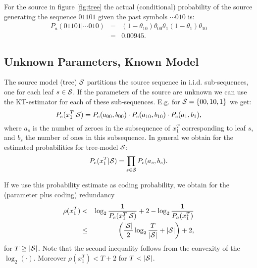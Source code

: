 \documentclass[10pt,conference]{IEEEtran}
\newcommand{\xT}{x^{T}_{1}}
\newcommand{\cS}{{\cal{S}}}
\begin{document}
For the source in figure \ref{fig:tree} the actual (conditional) probability of the source generating the sequence $01101$ given the past symbols $\cdots 010$ is:
\begin{eqnarray}
P_{a}(01101|\cdots 010)
&=& (1-\theta_{10}) \theta_{00} \theta_{1} (1-\theta_{1}) \theta_{10} \nonumber \\
&=& 0.00945.
\end{eqnarray}

\subsection{Unknown Parameters, Known Model}\label{subsec:knownmodel}
The source model (tree) $\cS$ partitions the source sequence in i.i.d. sub-sequences, one for each leaf $s\in\cS$.
If the parameters of the source are unknown we can use the KT-estimator for each of these sub-sequences.
E.g. for ${\cal S}= \{ 00, 10,1\}$ we get:
\begin{equation}
P_{e}(\xT|{\cal S}) = P_{e}(a_{00},b_{00}) \cdot P_{e}(a_{10},b_{10})\cdot P_{e}(a_{1},b_{1}),
\end{equation}
where $a_{s}$ is the number of zeroes in the subsequence of $\xT$ corresponding to leaf $s$, and $b_{s}$ the number of ones in this subsequence.
In general we obtain for the estimated probabilities for tree-model ${\cal S}$:
\begin{equation}
P_{e}(\xT|{\cal S}) = \prod_{s\in {\cal S}} P_{e}(a_{s},b_{s}).
\label{eq:codprobknmod}
\end{equation}

If we use this probability estimate as coding probability, we obtain for the (parameter plus coding) redundancy
\begin{eqnarray}
\rho(\xT) & < & \log_{2}\frac{1}{ P_{e}(\xT|{\cal S}) } + 2 - \log_{2}\frac{1}{ P_{a}(\xT) } \nonumber \\
&\leq& \left( \frac{|\cS|}{2} \log_{2}\frac{T}{|\cS|} + |\cS| \right) + 2,
\end{eqnarray}
for $T \geq |\cS|$.
Note that the second inequality follows from the convexity of the $\log_2(\cdot)$.
Moreover $\rho(\xT) < T+2$ for $T<|\cS|$.

\end{document}
